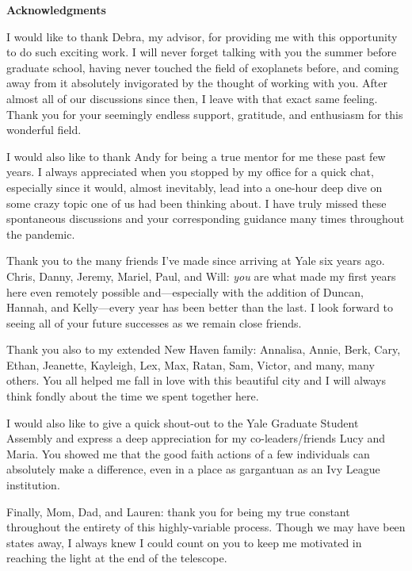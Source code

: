 \begin{center}
{\bf \large Acknowledgments}
\end{center}

I would like to thank Debra, my advisor, for providing me with this opportunity to do such exciting work. I will never forget talking with you the summer before graduate school, having never touched the field of exoplanets before, and coming away from it absolutely invigorated by the thought of working with you. After almost all of our discussions since then, I leave with that exact same feeling. Thank you for your seemingly endless support, gratitude, and enthusiasm for this wonderful field.

I would also like to thank Andy for being a true mentor for me these past few years. I always appreciated when you stopped by my office for a quick chat, especially since it would, almost inevitably, lead into a one-hour deep dive on some crazy topic one of us had been thinking about. I have truly missed these spontaneous discussions and your corresponding guidance many times throughout the pandemic.

Thank you to the many friends I've made since arriving at Yale six years ago. Chris, Danny, Jeremy, Mariel, Paul, and Will: \textit{you} are what made my first years here even remotely possible and---especially with the addition of Duncan, Hannah, and Kelly---every year has been better than the last. I look forward to seeing all of your future successes as we remain close friends.

Thank you also to my extended New Haven family: Annalisa, Annie, Berk, Cary, Ethan, Jeanette, Kayleigh, Lex, Max, Ratan, Sam, Victor, and many, many others. You all helped me fall in love with this beautiful city and I will always think fondly about the time we spent together here.

I would also like to give a quick shout-out to the Yale Graduate Student Assembly and express a deep appreciation for my co-leaders/friends Lucy and Maria. You showed me that the good faith actions of a few individuals can absolutely make a difference, even in a place as gargantuan as an Ivy League institution.

Finally, Mom, Dad, and Lauren: thank you for being my true constant throughout the entirety of this highly-variable process. Though we may have been states away, I always knew I could count on you to keep me motivated in reaching the light at the end of the telescope.